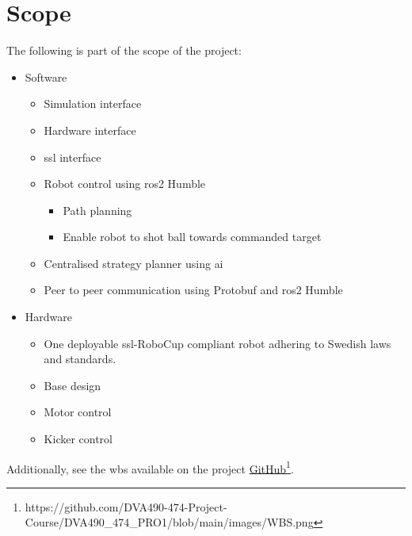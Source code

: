 \section{Scope}
\label{section:scope}

The following is part of the scope of the project:
\begin{itemize}
    \item Software
    \begin{itemize}
        \item Simulation interface
        \item Hardware interface
        \item \ac{ssl} interface
        \item Robot control using \ac{ros2} Humble
        \begin{itemize}
            \item Path planning
            \item Enable robot to shot ball towards commanded target
        \end{itemize}
        \item Centralised strategy planner using \ac{ai}
        \item Peer to peer communication using Protobuf and \ac{ros2} Humble
    \end{itemize}
    \item Hardware
    \begin{itemize}
        \item One deployable \ac{ssl}-RoboCup compliant robot adhering to Swedish laws and standards.
        \item Base design
        \item Motor control
        \item Kicker control
    \end{itemize}
\end{itemize}   
Additionally, see the \ac{wbs} available on the project \href{https://github.com/DVA490-474-Project-Course/DVA490_474_PRO1/blob/main/images/WBS.png}{GitHub}\footnote{https://github.com/DVA490-474-Project-Course/DVA490_474_PRO1/blob/main/images/WBS.png}.



